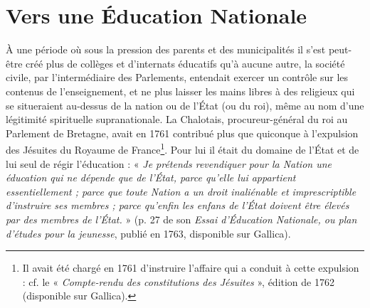 \section{Vers une Éducation Nationale}
 À une période où sous la pression des parents et des municipalités il s'est peut-être créé plus de collèges et d'internats éducatifs qu'à aucune autre, la société civile, par l'intermédiaire des Parlements, entendait exercer un contrôle sur les contenus de l'enseignement, et ne plus laisser les mains libres à des religieux qui se situeraient au-dessus de la nation ou de l'État (ou du roi), même au nom d'une légitimité spirituelle supranationale. 
 La Chalotais, procureur-général du roi au Parlement de Bretagne, avait en 1761 contribué plus que quiconque à l'expulsion des Jésuites du Royaume de France\footnote{Il avait été chargé en 1761 d'instruire l'affaire qui a conduit à cette expulsion : cf. le « \emph{Compte-rendu des constitutions des Jésuites} », édition de 1762 (disponible sur Gallica).}. 
Pour lui il était du domaine de l'État et de lui seul de régir l'éducation : « \emph{Je prétends revendiquer pour la Nation une éducation qui ne dépende que de l'État, parce qu'elle lui appartient essentiellement ; parce que toute Nation a un droit inaliénable et imprescriptible d'instruire ses membres ; parce qu'enfin les enfans de l'État doivent être élevés par des membres de l'État.} » (p. 27 de son \emph{Essai d'Éducation Nationale, ou plan d'études pour la jeunesse}, publié en 1763, disponible sur Gallica).

